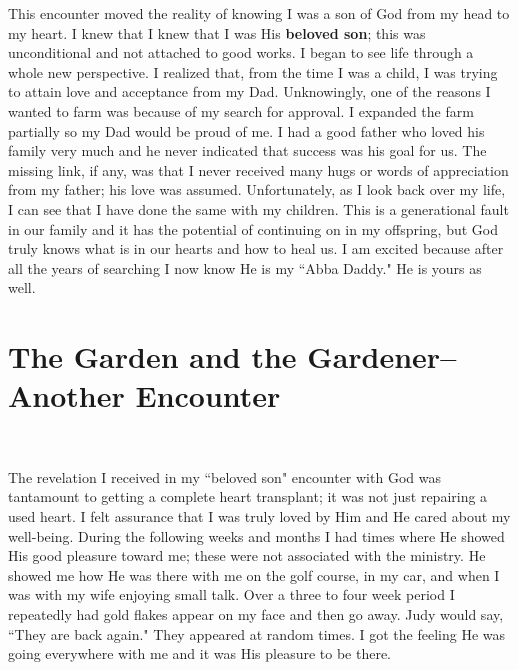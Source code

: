 \documentclass[oneside,12pt]{book}
\begin{document}
This encounter moved the reality of knowing I was a son of God from my head to my heart. I knew that I knew that I was His \textbf{beloved son}; this was unconditional and not attached to good works. I began to see life through a whole new perspective. I realized that, from the time I was a child, I was trying to attain love and acceptance from my Dad. Unknowingly, one of the reasons I wanted to farm was because of my search for approval. I expanded the farm partially so my Dad would be proud of me. I had a good father who loved his family very much and he never indicated that success was his goal for us. The missing link, if any, was that I never received many hugs or words of appreciation from my father; his love was assumed. Unfortunately, as I look back over my life, I can see that I have done the same with my children. This is a generational fault in our family and it has the potential of continuing on in my offspring, but God truly knows what is in our hearts and how to heal us. I am excited because after all the years of searching I now know He is my  ``Abba Daddy." He is yours as well. 


\section{The Garden and the Gardener--Another Encounter}
\

The revelation I received in my ``beloved son" encounter with God was tantamount to getting a complete heart transplant; it was not just repairing a used heart. I felt assurance that I was truly loved by Him and He cared about my well-being. During the following weeks and months I had times where He showed His good pleasure toward me; these were not associated with the ministry. He showed me how He was there with me on the golf course, in my car, and when I was with my wife enjoying small talk. Over a three to four week period I repeatedly had gold flakes appear on my face and then go away. Judy would say, ``They are back again." They appeared at random times. I got the feeling He was going everywhere with me and it was His pleasure to be there.
 
\end{document}
